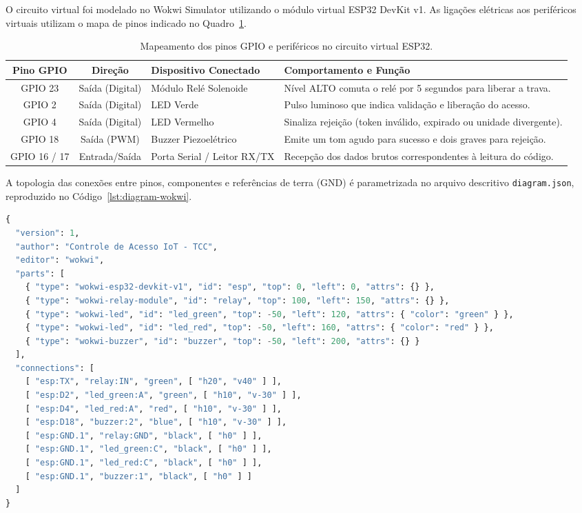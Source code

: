 O circuito virtual foi modelado no Wokwi Simulator utilizando o módulo virtual ESP32 DevKit v1. As ligações elétricas aos periféricos virtuais utilizam o mapa de pinos indicado no Quadro~\ref{quadro:pinout-esp32}.

\begin{table}[htbp]
\centering
\footnotesize
\caption{Mapeamento dos pinos GPIO e periféricos no circuito virtual ESP32.}
\label{quadro:pinout-esp32}
\begin{tabularx}{\textwidth}{c c p{3.8cm} X}
\toprule
\textbf{Pino GPIO} & \textbf{Direção} & \textbf{Dispositivo Conectado} & \textbf{Comportamento e Função} \\
\midrule
GPIO 23 & Saída (Digital) & Módulo Relé Solenoide & Nível ALTO comuta o relé por 5 segundos para liberar a trava. \\
GPIO 2 & Saída (Digital) & LED Verde & Pulso luminoso que indica validação e liberação do acesso. \\
GPIO 4 & Saída (Digital) & LED Vermelho & Sinaliza rejeição (token inválido, expirado ou unidade divergente). \\
GPIO 18 & Saída (PWM) & Buzzer Piezoelétrico & Emite um tom agudo para sucesso e dois graves para rejeição. \\
GPIO 16 / 17 & Entrada/Saída & Porta Serial / Leitor RX/TX & Recepção dos dados brutos correspondentes à leitura do código. \\
\bottomrule
\end{tabularx}
\end{table}

A topologia das conexões entre pinos, componentes e referências de terra (GND) é parametrizada no arquivo descritivo \texttt{diagram.json}, reproduzido no Código~\ref{lst:diagram-wokwi}.

\begin{lstlisting}[language=Python, caption={Arquivo descritivo diagram.json do circuito virtual no simulador Wokwi.}, label={lst:diagram-wokwi}]
{
  "version": 1,
  "author": "Controle de Acesso IoT - TCC",
  "editor": "wokwi",
  "parts": [
    { "type": "wokwi-esp32-devkit-v1", "id": "esp", "top": 0, "left": 0, "attrs": {} },
    { "type": "wokwi-relay-module", "id": "relay", "top": 100, "left": 150, "attrs": {} },
    { "type": "wokwi-led", "id": "led_green", "top": -50, "left": 120, "attrs": { "color": "green" } },
    { "type": "wokwi-led", "id": "led_red", "top": -50, "left": 160, "attrs": { "color": "red" } },
    { "type": "wokwi-buzzer", "id": "buzzer", "top": -50, "left": 200, "attrs": {} }
  ],
  "connections": [
    [ "esp:TX", "relay:IN", "green", [ "h20", "v40" ] ],
    [ "esp:D2", "led_green:A", "green", [ "h10", "v-30" ] ],
    [ "esp:D4", "led_red:A", "red", [ "h10", "v-30" ] ],
    [ "esp:D18", "buzzer:2", "blue", [ "h10", "v-30" ] ],
    [ "esp:GND.1", "relay:GND", "black", [ "h0" ] ],
    [ "esp:GND.1", "led_green:C", "black", [ "h0" ] ],
    [ "esp:GND.1", "led_red:C", "black", [ "h0" ] ],
    [ "esp:GND.1", "buzzer:1", "black", [ "h0" ] ]
  ]
}
\end{lstlisting}

